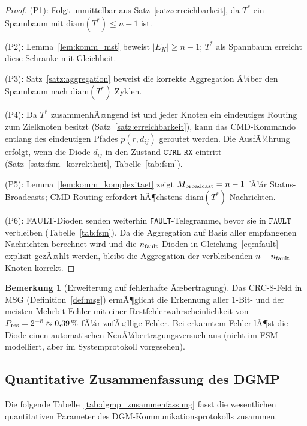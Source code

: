 ﻿\documentclass[a4paper,12pt]{article}
\theoremstyle{definition}
\newtheorem{bemerkung}[definition]{Bemerkung}
\theoremstyle{remark}
\begin{document}
\begin{proof}
(P1): Folgt unmittelbar aus Satz~\ref{satz:erreichbarkeit}, da $T^*$ ein
Spannbaum mit $\mathrm{diam}(T^*) \leq n-1$ ist.

(P2): Lemma~\ref{lem:komm_mst} beweist $|E_K| \geq n-1$; $T^*$ als Spannbaum
erreicht diese Schranke mit Gleichheit.

(P3): Satz~\ref{satz:aggregation} beweist die korrekte Aggregation Ã¼ber
den Spannbaum nach $\mathrm{diam}(T^*)$ Zyklen.

(P4): Da $T^*$ zusammenhÃ¤ngend ist und jeder Knoten ein eindeutiges Routing
zum Zielknoten besitzt (Satz~\ref{satz:erreichbarkeit}), kann das
CMD-Kommando entlang des eindeutigen Pfades $p(r, d_{ij})$ geroutet werden.
Die AusfÃ¼hrung erfolgt, wenn die Diode $d_{ij}$ in den Zustand
$\mathtt{CTRL\_RX}$ eintritt (Satz~\ref{satz:fsm_korrektheit},
Tabelle~\ref{tab:fsm}).

(P5): Lemma~\ref{lem:komm_komplexitaet} zeigt $M_{\rm broadcast} = n-1$
fÃ¼r Status-Broadcasts; CMD-Routing erfordert hÃ¶chstens
$\mathrm{diam}(T^*)$ Nachrichten.

(P6): FAULT-Dioden senden weiterhin \texttt{FAULT}-Telegramme, bevor sie
in $\mathtt{FAULT}$ verbleiben (Tabelle~\ref{tab:fsm}). Da die Aggregation
auf Basis aller empfangenen Nachrichten berechnet wird und die
$n_{\rm fault}$ Dioden in Gleichung~\eqref{eq:nfault} explizit gezÃ¤hlt werden,
bleibt die Aggregation der verbleibenden $n - n_{\rm fault}$ Knoten korrekt.
\qedhere
\end{proof}

\begin{bemerkung}[Erweiterung auf fehlerhafte Ãœbertragung]
\label{bem:fehler}
Das CRC-8-Feld in MSG (Definition~\ref{def:msg}) ermÃ¶glicht die Erkennung
aller 1-Bit- und der meisten Mehrbit-Fehler mit einer Restfehlerwahrscheinlichkeit
von $P_{\rm res} = 2^{-8} \approx 0{,}39\,\%$ fÃ¼r zufÃ¤llige Fehler.
Bei erkanntem Fehler lÃ¶st die Diode einen automatischen
NeuÃ¼bertragungsversuch aus (nicht im FSM modelliert, aber im
Systemprotokoll vorgesehen).
\end{bemerkung}

\subsection{Quantitative Zusammenfassung des DGMP}

Die folgende Tabelle~\ref{tab:dgmp_zusammenfassung} fasst die wesentlichen
quantitativen Parameter des DGM-Kommu\-nikationsprotokolls zusammen.
\end{document}
